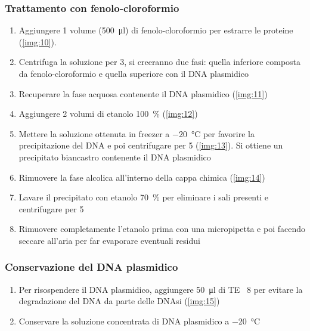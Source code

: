 \subsubsection{Trattamento con fenolo-cloroformio}
\begin{enumerate}
	\item Aggiungere 1 volume (\qty{500}{\micro\litre}) di fenolo-cloroformio per estrarre le proteine (\autoref{img:10}).  
	\item  Centrifuga la soluzione per \qty{3}{\min}, si creeranno due fasi: quella inferiore composta da fenolo-cloroformio e quella superiore con il DNA plasmidico
	\item Recuperare la fase acquosa contenente il DNA plasmidico (\autoref{img:11})
	\item Aggiungere 2 volumi di etanolo \qty{100}{\percent} (\autoref{img:12})
	\item Mettere la soluzione ottenuta in freezer a \qty{-20}{\celsius} per favorire la precipitazione del DNA e poi centrifugare per \qty{5}{\min} (\autoref{img:13}). Si ottiene un precipitato biancastro contenente il DNA plasmidico
	\item Rimuovere la fase alcolica all’interno della cappa chimica (\autoref{img:14})
	\item Lavare il precipitato con etanolo \qty{70}{\percent} per eliminare i sali presenti e centrifugare per \qty{5}{\min}
	\item Rimuovere completamente l’etanolo prima con una micropipetta e poi facendo seccare all’aria per far evaporare eventuali residui
\end{enumerate}

\subsubsection{Conservazione del DNA plasmidico}
\begin{enumerate}
	\item  Per risospendere il DNA plasmidico, aggiungere \qty{50}{\micro\litre} di TE \pH\ 8 per evitare la degradazione del DNA da parte delle DNAsi (\autoref{img:15})
	\item  Conservare la soluzione concentrata di DNA plasmidico a \qty{-20}{\celsius}
\end{enumerate}

\begingroup
\newpage


